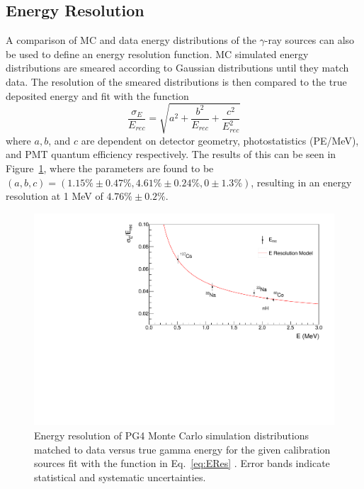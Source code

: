 \subsection{Energy Resolution}

A comparison of MC and data energy distributions of the $\gamma$-ray sources can also be used to define an energy resolution function. 
MC simulated energy distributions are smeared according to Gaussian distributions until they match data. 
The resolution of the smeared distributions is then compared to the true deposited energy and fit with the function
\begin{equation}
	\frac{\sigma_E}{E_{rec}} = \sqrt{a^2 + \frac{b^2}{E_{rec}} + \frac{c^2}{E^2_{rec}}}
	\label{eq:ERes}
\end{equation}
where $a, b$, and $c$ are dependent on detector geometry, photostatistics (PE/MeV), and PMT quantum efficiency respectively. 
The results of this can be seen in Figure~\ref{fig:gammares}, where the parameters are found to be $(a,b,c) = (1.15\%\pm0.47\%, 4.61\%\pm0.24\%, 0\pm1.3\%)$, resulting in an energy resolution at 1 MeV of $4.76\%\pm0.2\%$.


\begin{figure}[h]
	\centering
	\includegraphics[width=0.7\linewidth]{tex/5-analysis-images/GammaRes}
	\caption[]{Energy resolution of PG4 Monte Carlo simulation distributions matched to data versus true gamma energy for the given calibration sources fit with the function in Eq.~\ref{eq:ERes} \cite{XZhang:2815}. Error bands indicate statistical and systematic uncertainties.}
	\label{fig:gammares}
\end{figure}



